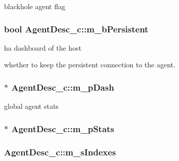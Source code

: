 blackhole agent flag 

\hypertarget{classAgentDesc__c_a0b6849f28e78820dd0083c25c29b904a}{
\subsubsection[{m\-\_\-b\-Persistent}]{\setlength{\rightskip}{0pt plus 5cm}bool Agent\-Desc\-\_\-c\-::m\-\_\-b\-Persistent}}\label{classAgentDesc__c_a0b6849f28e78820dd0083c25c29b904a}


ha dashboard of the host 

whether to keep the persistent connection to the agent. \hypertarget{classAgentDesc__c_a7db1c1a813385d67fa69fb71ee6ef468}{
\subsubsection[{m\-\_\-p\-Dash}]{$\ast$ Agent\-Desc\-\_\-c\-::m\-\_\-p\-Dash\hspace{0.3cm}{\ttfamily [mutable]}}}\label{classAgentDesc__c_a7db1c1a813385d67fa69fb71ee6ef468}


global agent stats 

\hypertarget{classAgentDesc__c_aa307a0d445fbfdaed3e0f85d9eb3cc18}{
\subsubsection[{m\-\_\-p\-Stats}]{$\ast$ Agent\-Desc\-\_\-c\-::m\-\_\-p\-Stats\hspace{0.3cm}{\ttfamily [mutable]}}}\label{classAgentDesc__c_aa307a0d445fbfdaed3e0f85d9eb3cc18}
\hypertarget{classAgentDesc__c_a027b0d2b65c7114eb9d98262484e6721}{
\subsubsection[{m\-\_\-s\-Indexes}]{ Agent\-Desc\-\_\-c\-::m\-\_\-s\-Indexes}}\label{classAgentDesc__c_a027b0d2b65c7114eb9d98262484e6721}


